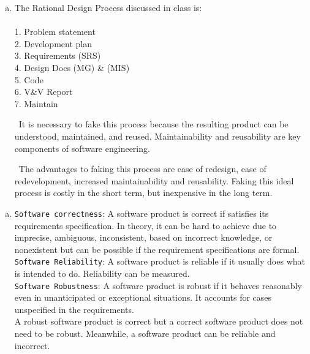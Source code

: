 \documentclass[12pt]{article}
\begin{document}
\begin{enumerate}[(e)]

\item The Rational Design Process discussed in class is:\\\\
1. Problem statement\\
2. Development plan\\
3. Requirements (SRS)\\
4. Design Docs (MG) \& (MIS)\\
5. Code\\
6. V\&V Report\\
7. Maintain

~\newline\noindent It is necessary to fake this process because the resulting product can be understood, maintained, and reused. Maintainability and reusability are key components of software engineering.

~\newline\noindent The advantages to faking this process are ease of redesign, ease of redevelopment, increased maintainability and reusability. Faking this ideal process is costly in the
short term, but inexpensive in the long term.

\end{enumerate}

\begin{enumerate}[(f)]

\item \texttt{Software correctness}: A software product is correct if satisfies its requirements specification. In theory, it can be hard to achieve due to imprecise, ambiguous, inconsistent, based on incorrect knowledge, or nonexistent but can be possible if the requirement specifications are formal.\\

\texttt{Software Reliability}: A software product is reliable if it usually does what is intended to do. Reliability can be measured.\\

\texttt{Software Robustness}: A software product is robust if it behaves reasonably even in unanticipated or exceptional situations. It accounts for cases unspecified in the requirements.\\

A robust software product is correct but a correct software product does not need to be robust.
Meanwhile, a software product can be reliable and incorrect.  

\end{enumerate}
\end{document}
